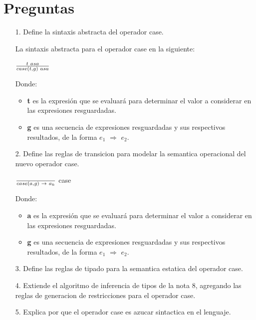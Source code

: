 \documentclass{article}
\begin{document}
    \section{Preguntas}
    \begin{itemize}
        \item[1.] Define la sintaxis abstracta del operador case.
        
        La sintaxis abstracta para el operador {\sf case} en la siguiente:
        \begin{center}
                \Large{$\frac{t\hspace{0.1cm}asa}{case(t,g)\hspace{0.1cm}asa}$}
            \end{center}
        Donde:
        \begin{itemize}
            \item \textbf{t} es la expresión que se evaluará para determinar el valor a considerar en las expresiones resguardadas.

            \item \textbf{g} es una secuencia de expresiones resguardadas y sus respectivos resultados, de la forma $e_1$ $\Rightarrow$ $e_2$.\\
        \end{itemize}
        
        \item[2.] Define las reglas de transicion para modelar la semantica operacional del nuevo operador case.
        \begin{center}
                {\Large{$\frac{}{case(a,g)\hspace{0.1cm}\rightarrow\hspace{0.1cm}a_k}$}}\hspace{0.2cm} case
            \end{center}
        Donde:
        \begin{itemize}
            \item \textbf{a}  es la expresión que se evaluará para determinar el valor a considerar en las expresiones resguardadas.

            \item \textbf{g} es una secuencia de expresiones resguardadas y sus respectivos resultados, de la forma $e_1$ $\Rightarrow$ $e_2$.\\
        \end{itemize}
        
        \item[3.] Define las reglas de tipado para la semantica estatica del operador case.
        \item[4.] Extiende el algoritmo de inferencia de tipos de la nota 8, agregando las reglas de generacion de restricciones para el operador case.
        \item[5.] Explica por que el operador case es azucar sintactica en el lenguaje.
    \end{itemize}
\end{document}
